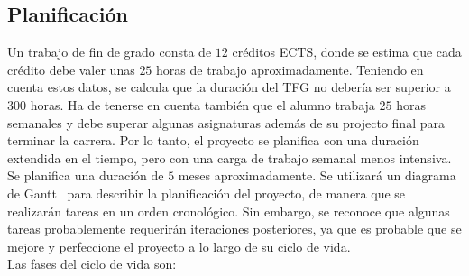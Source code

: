 \subsection{Planificación}
Un trabajo de fin de grado consta de $12$ créditos ECTS, donde se estima que cada crédito debe valer unas $25$ horas de trabajo aproximadamente. Teniendo en cuenta estos datos, se calcula que la duración del TFG no debería ser superior a $300$ horas. Ha de tenerse en cuenta también que el alumno trabaja $25$ horas semanales y debe superar algunas asignaturas además de su projecto final para terminar la carrera. Por lo tanto, el proyecto se planifica con una duración extendida en el tiempo, pero con una carga de trabajo semanal menos intensiva.\\[6pt]
Se planifica una duración de $5$ meses aproximadamente. Se utilizará un diagrama de Gantt~\cite{Clark1922} para describir la planificación del proyecto, de manera que se realizarán tareas en un orden cronológico. Sin embargo, se reconoce que algunas tareas probablemente requerirán iteraciones posteriores, ya que es probable que se mejore y perfeccione el proyecto a lo largo de su ciclo de vida.\\[6pt]
Las fases del ciclo de vida son:
